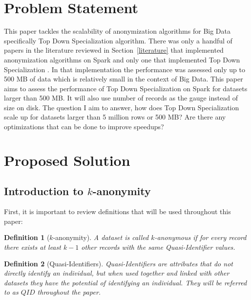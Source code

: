 \documentclass[11pt]{article}       %
\newtheorem{definition}{Definition}
\begin{document}
\section{Problem Statement} \label{problem}

This paper tackles the scalability of anonymization algorithms for Big Data specifically Top Down Specialization algorithm. There was only a handful of papers in the literature reviewed in Section~\ref{literature} that implemented anonymization algorithms on Spark and only one that implemented Top Down Specialization \cite{Sopaoglu:2017}. In that implementation the performance was assessed only up to 500 MB of data which is relatively small in the context of Big Data. This paper aims to assess the performance of Top Down Specialization on Spark for datasets larger than 500 MB. It will also use number of records as the gauge instead of size on disk. The question I aim to answer, how does Top Down Specialization scale up for datasets larger than 5 million rows or 500 MB? Are there any optimizations that can be done to improve speedups?

\section{Proposed Solution} \label{solution}

\subsection{Introduction to $k$-anonymity}

First, it is important to review definitions that will be used throughout this paper:

\begin{definition}[$k$-anonymity]
A dataset is called $k$-anonymous if for every record there exists at least \(k-1\) other records with the same Quasi-Identifier values. 
\end{definition}

\begin{definition}[Quasi-Identifiers]
Quasi-Identifiers are attributes that do not directly identify an individual, but when used together and linked with other datasets they have the potential of identifying an individual. They will be referred to as $QID$ throughout the paper.
\end{definition}
\end{document}
